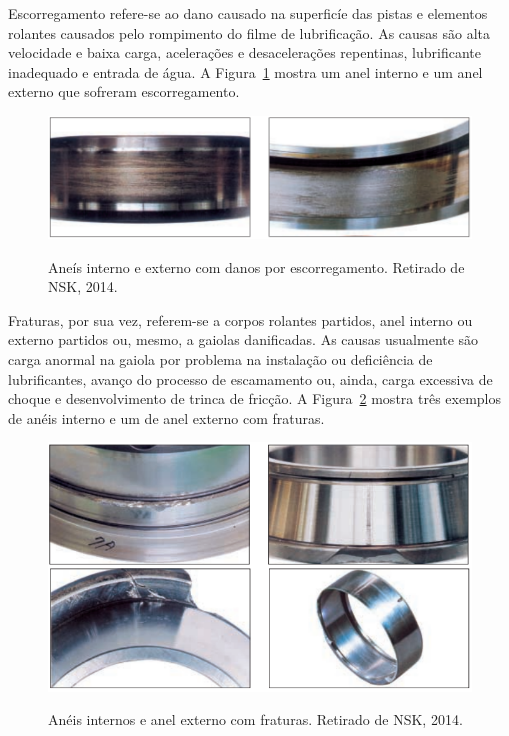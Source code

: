 \documentclass[
	12pt,				
	oneside,			
	a4paper,			
	english,			
	brazil,			
	]{abntex2ppgsi}
\begin{document}
Escorregamento refere-se ao dano causado na superficíe das pistas e elementos rolantes causados pelo rompimento do filme de lubrificação. As causas são alta velocidade e baixa carga, acelerações e desacelerações repentinas, lubrificante inadequado e entrada de água. A Figura~\ref{escorregamento_nsk} mostra um anel interno e um anel externo que sofreram escorregamento. 

\begin{figure}[H]
\centering
\caption {Aneís interno e externo com danos por escorregamento. Retirado de NSK, 2014.}
\includegraphics[width=\textwidth,height=\textheight,keepaspectratio]{escorregamento_nsk}
\label{escorregamento_nsk}
\end{figure}

Fraturas, por sua vez, referem-se a corpos rolantes partidos, anel interno ou externo partidos ou, mesmo, a gaiolas danificadas. As causas usualmente são carga anormal na gaiola por problema na instalação ou deficiência de lubrificantes, avanço do processo de escamamento ou, ainda, carga excessiva de choque e desenvolvimento de trinca de fricção. A Figura~\ref{fraturas_nsk} mostra três exemplos de anéis interno e um de anel externo com fraturas. 

\begin{figure}[H]
\centering
\caption {Anéis internos e anel externo com fraturas. Retirado de NSK, 2014.}
\includegraphics[width=\textwidth,height=\textheight,keepaspectratio]{fraturas_nsk}
\label{fraturas_nsk}
\end{figure}
\end{document}
